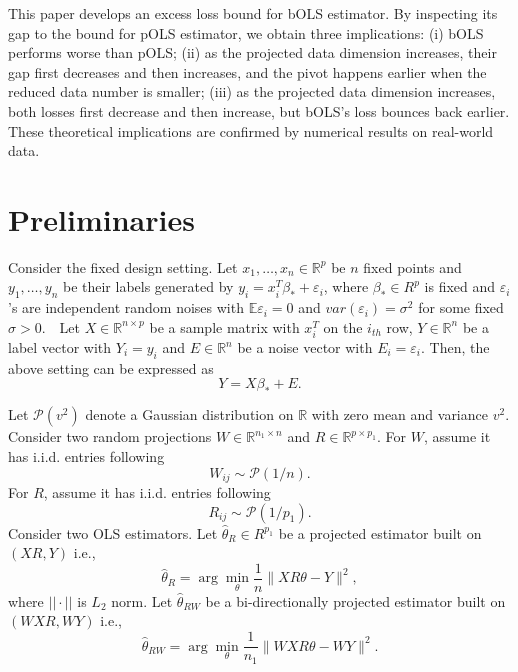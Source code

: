 \documentclass[a4paper,fleqn]{cas-sc}
\theoremstyle{plain}
\newcommand{\R}{\mathbb{R}}
\newcommand{\E}{\mathbb{E}}
\newcommand{\p}{\mathcal{P}}
\newcommand{\e}{\varepsilon}
\newcommand{\be}{\beta}
\newcommand{\te}{\theta}
\begin{document}
This paper develops an excess 
loss bound for bOLS estimator. 
By inspecting its gap to the 
bound for pOLS estimator, 
we obtain three implications: 
(i) bOLS performs worse than pOLS; 
(ii) as the projected data dimension increases, their gap 
first decreases and then increases, and the pivot happens earlier 
when the reduced data number is smaller; 
(iii) as the projected data dimension 
increases, both losses first decrease 
and then increase, but bOLS's 
loss bounces back earlier. These 
theoretical implications are confirmed 
by numerical results on real-world data. 

\section{Preliminaries}

Consider the fixed design setting. 
Let $x_1, \ldots, x_n \in \R^p$ be 
$n$ fixed points and $y_1, \ldots, 
y_n$ be their labels generated by 
$y_i = x_i^T \be_* + \e_i$, 
where $\be_* \in R^p$ is fixed 
and $\e_i$'s are independent 
random noises with $\E \e_i = 0$ 
and $var(\e_i) = \sigma^2$ for 
some fixed $\sigma >0$.\ \  
Let $X \in \R^{n \times p}$ 
be a sample matrix with 
$x_i^T$ on the $i_{th}$ row, 
$Y \in \R^n$ be a label 
vector with $Y_i = y_i$ 
and $E \in \R^n$ be a 
noise vector with $E_i = \e_i$. 
Then, the above setting 
can be expressed as 
\begin{equation}
Y = X \be_* + E.    
\end{equation}

Let $\p(v^2)$ denote a Gaussian 
distribution on $\R$ with zero mean 
and variance $v^2$. 
Consider two random projections
$W \in \R^{n_1 \times n}$ 
and $R \in \R^{p \times p_1}$. 
For $W$, assume it has i.i.d. 
entries following 
\begin{equation}
\label{eq:sampleW}
W_{ij} \sim \p(1/n).      
\end{equation}
For $R$, assume it has i.i.d. 
entries following 
\begin{equation}
\label{eq:sampleR}
R_{ij} \sim \p(1/p_1).     
\end{equation}
Consider two OLS estimators. 
Let $\hat{\te}_R \in R^{p_1}$ 
be a projected estimator built 
on $(XR, Y)$ i.e., 
\begin{equation}
\label{eq:def_teR}
\hat{\te}_R = \arg\min_{\te} 
\frac{1}{n} \parallel X R \te - Y \parallel^2,      
\end{equation}
where $||\cdot||$ is $L_2$ norm. 
Let $\hat{\te}_{RW}$ be a bi-directionally 
projected estimator built on $(WXR, WY)$ i.e., 
\begin{equation}
\hat{\te}_{RW} = \arg\min_{\te} 
\frac{1}{n_1} \parallel W X R \te - W Y \parallel^2.
\end{equation}
\end{document}
